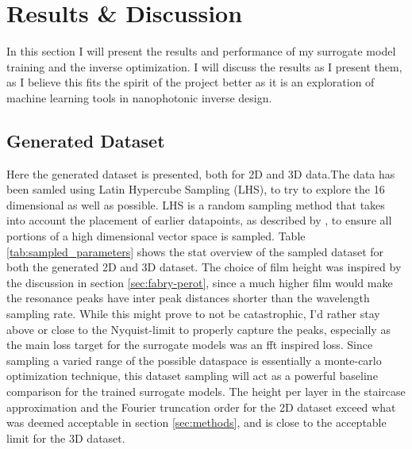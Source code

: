 \chapter{Results \& Discussion}
\label{sec:results}
In this section I will present the results and performance of my surrogate model training and the inverse optimization.
I will discuss the results as I present them, as I believe this fits the spirit of the project better as it is an exploration of machine learning tools in nanophotonic inverse design.

\section{Generated Dataset}
Here the generated dataset is presented, both for 2D and 3D data.The data has been samled using Latin Hypercube Sampling (LHS), to try to explore the 16 dimensional as well as possible. LHS is a random sampling method that takes into account the placement of earlier datapoints, as described by \cite{mckay1979comparison}, to ensure all portions of a high dimensional vector space is sampled.
Table \ref{tab:sampled_parameters} shows the stat overview of the sampled dataset for both the generated 2D and 3D dataset. The choice of film height was inspired by the discussion in section \ref{sec:fabry-perot}, since a much higher film would make the resonance peaks have inter peak distances shorter than the wavelength sampling rate.
While this might prove to not be catastrophic, I'd rather stay above or close to the Nyquist-limit to properly capture the peaks, especially as the main loss target for the surrogate models was an fft inspired loss.
Since sampling a varied range of the possible dataspace is essentially a monte-carlo optimization technique, this dataset sampling will act as a powerful baseline comparison for the trained surrogate models. The height per layer in the staircase approximation and the Fourier truncation order for the 2D dataset exceed what was deemed acceptable in section \ref{sec:methods}, and is close to the acceptable limit for the 3D dataset.
